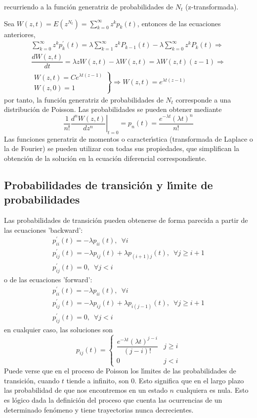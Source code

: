 recurriendo a la funci\'{o}n generatriz de probabilidades de $N_t$
(z-transformada).
\par
Sea $W(z,t)=E(z^{N_t})=\displaystyle\sum_{k=0}^\infty z^kp_k(t)$,
entonces de las ecuaciones anteriores,
\[
\begin{array}{l}
\displaystyle\sum_{k=0}^\infty z^k
p_k^\prime(t)=\lambda\displaystyle\sum_{k=1}^\infty z^k
P_{k-1}(t)-\lambda \displaystyle\sum_{k=0}^\infty z^k
P_k(t)\Rightarrow
\\[15pt]
\dfrac{d W(z,t)}{dt}=\lambda zW(z,t)-\lambda W(z,t)=\lambda
W(z,t)(z-1)\Rightarrow\\[10pt]
\left.\begin{array}{l}
W(z,t)=Ce^{\lambda t(z-1)}\\
W(z,0)=1 \end{array}\right \}\Rightarrow W(z,t) = e^{\lambda
t(z-1)}
\end{array}
\]
por tanto, la funci\'{o}n generatriz de probabilidades de $N_t$
corresponde a una distribuci\'{o}n de Poisson. Las probabilidades se
pueden obtener mediante
\[
\frac{1}{n!}\left.\dfrac{d^nW(z,t)}{dz^n}\right
|_{t=0}=p_n(t)=\dfrac{e^{-\lambda t}(\lambda t)^n}{n!}
\]
Las funciones generatriz de momentos o caracter\'{\i}stica
(transformada de Laplace o la de Fourier) se pueden utilizar con
todas sus propiedades, que simplifican la obtenci\'{o}n de la soluci\'{o}n
en la ecuaci\'{o}n diferencial correspondiente.
\subsection{Probabilidades de transici\'{o}n y l\'{\i}mite
de probabilidades}
Las probabilidades de transici\'{o}n pueden obtenerse de forma
parecida a partir de las ecuaciones 'backward':
\[
\begin{array}{l}
p^\prime_{ii}(t)=-\lambda p_{ii}(t),\enspace \forall i\\
p^\prime_{ij}(t)=-\lambda p_{ij}(t)+\lambda p_{(i+1)j}(t),\enspace
\forall j\geq i+1\\
p^\prime_{ij}(t)=0,\enspace \forall j<i
\end{array}
\]
o de las ecuaciones 'forward':
\[
\begin{array}{l}
p^\prime_{ii}(t)=-\lambda p_{ii}(t),\enspace \forall i\\
p^\prime_{ij}(t)=-\lambda p_{ij}(t)+\lambda p_{i(j-1)}(t),\enspace
\forall j\geq i+1\\
p^\prime_{ij}(t)=0,\enspace \forall j<i
\end{array}
\]
en cualquier caso, las soluciones son
\[
p_{ij}(t)=\left\{\begin{array}{ll} \dfrac{e^{-\lambda t}(\lambda
t)^{j-i}}{(j-i)!}&j\geq i\\
0&j<i
\end{array}\right.
\]
Puede verse que en el proceso de Poisson los l\'{\i}mites de las
probabilidades de transici\'{o}n, cuando $t$ tiende a infinito, son 0.
Esto significa que en el largo plazo las probabilidad de que nos
encontremos en un estado $n$ cualquiera es nula. Esto es l\'{o}gico
dada la definici\'{o}n del proceso que cuenta las ocurrencias de un
determinado fen\'{o}meno y tiene trayectorias nunca decrecientes.
